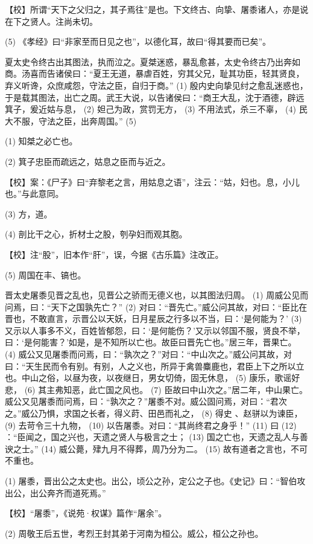 \documentclass[12pt,UTF8]{ctexbook}
\begin{document}
【校】所谓“天下之父归之，其子焉往”是也。下文终古、向挚、屠黍诸人，亦是说在下之贤人。注尚未切。

(5) 《孝经》曰“非家至而日见之也”，以德化耳，故曰“得其要而已矣”。

夏太史令终古出其图法，执而泣之。夏桀迷惑，暴乱愈甚，太史令终古乃出奔如商。汤喜而告诸侯曰：“夏王无道，暴虐百姓，穷其父兄，耻其功臣，轻其贤良，弃义听谗，众庶咸怨，守法之臣，自归于商。” (1) 殷内史向挚见纣之愈乱迷惑也，于是载其图法，出亡之周。武王大说，以告诸侯曰：“商王大乱，沈于酒德，辟远箕子，爰近姑与息， (2) 妲己为政，赏罚无方， (3) 不用法式，杀三不辜， (4) 民大不服，守法之臣，出奔周国。” (5)

(1) 知桀之必亡也。

(2) 箕子忠臣而疏远之，姑息之臣而与近之。

【校】案：《尸子》曰“弃黎老之言，用姑息之语”，注云：“姑，妇也。息，小儿也。”与此意同。

(3) 方，道。

(4) 剖比干之心，折材士之股，刳孕妇而观其胞。

【校】注“股”，旧本作“肝”，误，今据《古乐篇》注改正。

(5) 周国在丰、镐也。

晋太史屠黍见晋之乱也，见晋公之骄而无德义也，以其图法归周。 (1) 周威公见而问焉，曰：“天下之国孰先亡？” (2) 对曰：“晋先亡。”威公问其故，对曰：“臣比在晋也，不敢直言，示晋公以天妖，日月星辰之行多以不当，曰：‘是何能为？’ (3) 又示以人事多不义，百姓皆郁怨，曰：‘是何能伤？’又示以邻国不服，贤良不举，曰：‘是何能害？’如是，是不知所以亡也。故臣曰晋先亡也。”居三年，晋果亡。 (4) 威公又见屠黍而问焉，曰：“孰次之？”对曰：“中山次之。”威公问其故，对曰：“天生民而令有别。有别，人之义也，所异于禽兽麋鹿也，君臣上下之所以立也。中山之俗，以昼为夜，以夜继日，男女切倚，固无休息， (5) 康乐，歌谣好悲， (6) 其主弗知恶，此亡国之风也。 (7) 臣故曰中山次之。”居二年，中山果亡。威公又见屠黍而问焉，曰：“孰次之？”屠黍不对。威公固问焉，对曰：“君次之。”威公乃惧，求国之长者，得义莳、田邑而礼之， (8) 得史 、赵骈以为谏臣， (9) 去苛令三十九物， (10) 以告屠黍。对曰：“其尚终君之身乎！” (11) 曰 (12) ：“臣闻之，国之兴也，天遗之贤人与极言之士； (13) 国之亡也，天遗之乱人与善谀之士。” (14) 威公薨，肂九月不得葬，周乃分为二。 (15) 故有道者之言也，不可不重也。

(1) 屠黍，晋出公之太史也。出公，顷公之孙，定公之子也。《史记》曰：“智伯攻出公，出公奔齐而道死焉。”

【校】“屠黍”，《说苑·权谋》篇作“屠余”。

(2) 周敬王后五世，考烈王封其弟于河南为桓公。威公，桓公之孙也。
\end{document}
